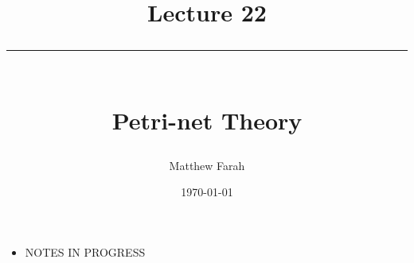 \documentclass{article}
\date{
	\vspace{-.75em}
	{\large \today}
}
\title{
	\vspace*{-1.5em}
	{\Huge Lecture 22} \\
	\vspace{-1em}
	\rule{\textwidth/4}{.01em} \\
	\vspace{-.25em}
	{\Large Petri-net Theory}
	\vspace{-.75em}
}
\author{
	{\large Matthew Farah}
}
\begin{document}
\maketitle
\pagestyle{fancy}

\fi

\begin{itemize}
	\item NOTES IN PROGRESS
\end{itemize}

\ifdefined\iscombined
	\newpage
\else
	
\end{document}
